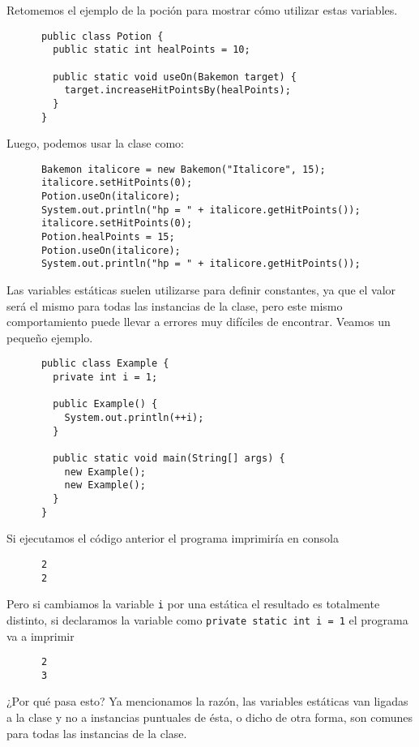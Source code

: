     Retomemos el ejemplo de la poción para mostrar cómo utilizar estas variables.

    \begin{verbatim}
      public class Potion {
        public static int healPoints = 10;

        public static void useOn(Bakemon target) {
          target.increaseHitPointsBy(healPoints);
        }
      }
    \end{verbatim}

    Luego, podemos usar la clase como:
    \begin{verbatim}
      Bakemon italicore = new Bakemon("Italicore", 15);
      italicore.setHitPoints(0);
      Potion.useOn(italicore);
      System.out.println("hp = " + italicore.getHitPoints());
      italicore.setHitPoints(0);
      Potion.healPoints = 15;
      Potion.useOn(italicore);
      System.out.println("hp = " + italicore.getHitPoints());
    \end{verbatim}

    Las variables estáticas suelen utilizarse para definir constantes, ya que el valor será el mismo
    para todas las instancias de la clase, pero este mismo comportamiento puede llevar a errores muy
    difíciles de encontrar.
    Veamos un pequeño ejemplo.
  
    \begin{verbatim}
      public class Example {
        private int i = 1;

        public Example() {
          System.out.println(++i);
        }

        public static void main(String[] args) {
          new Example();
          new Example();
        }
      }
    \end{verbatim}

    Si ejecutamos el código anterior el programa imprimiría en consola
    \begin{verbatim}
      2
      2
    \end{verbatim}

    Pero si cambiamos la variable \texttt{i} por una estática el resultado es totalmente distinto,
    si declaramos la variable como \texttt{private static int i = 1} el programa va a 
    imprimir
    \begin{verbatim}
      2
      3
    \end{verbatim}
    
    ¿Por qué pasa esto?
    Ya mencionamos la razón, las variables estáticas van ligadas a la clase y no a instancias 
    puntuales de ésta, o dicho de otra forma, son comunes para todas las instancias de la clase.

